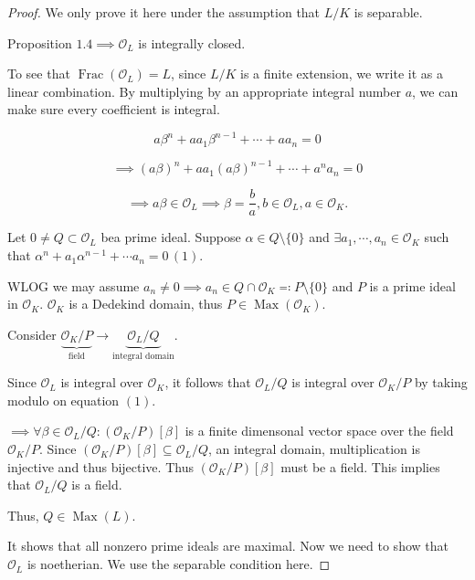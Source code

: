 \documentclass[openany]{amsbook}
\numberwithin{section}{chapter}
\theoremstyle{definition}
\newcommand{\Frac}{\operatorname{Frac}}
\begin{document}
\begin{proof}
    We only prove it here under the assumption that \(L / K\) is separable.

    Proposition \(1.4 \implies \mathcal{O}_L\) is integrally closed.

    To see that \(\Frac(\mathcal{O}_L) = L\), since \(L / K\) is a finite extension, we write it as a linear combination. By multiplying by an appropriate integral number \(a\), we can make sure every coefficient is integral.

    \[
        a \beta^n + a a_1 \beta^{n-1} + \cdots + a a_n = 0
    \]

    \[
        \implies (a \beta)^n + a a_1 (a \beta)^{n-1} + \cdots + a^n a_n = 0
    \]

    \[
        \implies a \beta \in \mathcal{O}_L \implies \beta = \frac{b}{a}, b\in \mathcal{O}_L, a \in \mathcal{O}_K.
    \]
    
    Let \(0 \neq Q \subset \mathcal{O}_L\) bea prime ideal. Suppose \(\alpha \in Q \setminus \{ 0 \}\) and \(\exists a_1, \cdots , a_n \in \mathcal{O}_K\) such that \(\alpha^n + a_1 \alpha^{n-1} + \cdots a_n = 0\,(1)\).

    WLOG we may assume \(a_n \neq 0 \implies a_n \in Q \cap \mathcal{O}_K \eqqcolon P \setminus \{ 0 \} \) and \(P\) is a prime ideal in \(\mathcal{O}_K\). \(\mathcal{O}_K\) is a Dedekind domain, thus \(P \in \operatorname{Max} (\mathcal{O}_K)\).

    Consider \(\underbrace{\mathcal{O}_K / P}_{\text{field}} \to \underbrace{\mathcal{O}_L / Q}_{\text{integral domain}}\). 
    
    Since \(\mathcal{O}_L\) is integral over \(\mathcal{O}_K\), it follows that \(\mathcal{O}_L / Q\) is integral over \(\mathcal{O}_K / P\) by taking modulo on equation \((1)\). 

    \(\implies \forall \beta \in \mathcal{O}_L / Q: (\mathcal{O}_K / P)[\beta]\) is a finite dimensonal vector space over the field \(\mathcal{O}_K / P\).  Since \((\mathcal{O}_K / P)[\beta] \subseteq \mathcal{O}_L / Q\), an integral domain, multiplication is injective and thus bijective. Thus \((\mathcal{O}_K / P)[\beta]\) must be a field. This implies that \(\mathcal{O}_L / Q\) is a field.

    Thus, \(Q\in \operatorname{Max}(L)\). 

    It shows that all nonzero prime ideals are maximal. Now we need to show that \(\mathcal{O}_L\) is noetherian. We use the separable condition here.


\end{proof}
\end{document}

